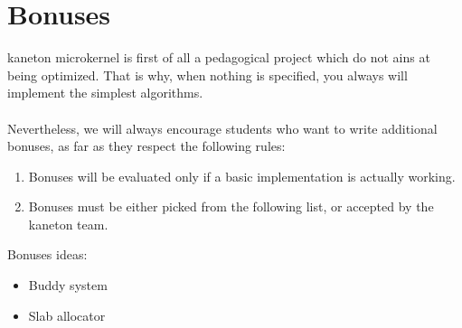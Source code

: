 %
%

\newpage

\section{Bonuses}

kaneton microkernel is first of all a pedagogical project which do not ains at being
optimized. That is why, when nothing is specified, you always will implement the simplest
algorithms.\\
\\
Nevertheless, we will always encourage students who want to write additional bonuses, as far as they respect the following rules:
\begin{enumerate}
  \item Bonuses will be evaluated only if a basic implementation is actually working.
  \item Bonuses must be either picked from the following list, or accepted by the kaneton team.\\
\end{enumerate}

Bonuses ideas:
\begin{itemize}
\item Buddy system
\item Slab allocator
\end{itemize}
